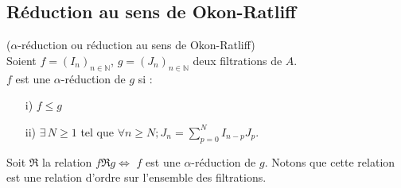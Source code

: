 \subsection{Réduction au sens de Okon-Ratliff}
\begin{madefinition}
	($\alpha$-réduction ou réduction au sens de Okon-Ratliff)\\
	Soient $f=(I_n)_{n \in \mathbb{N}}$, $g=(J_n)_{n \in \mathbb{N}}$ deux filtrations de $A$.\\
	$f$ est une $\alpha$-réduction de $g$ si : \\
	\begin{enumerate}
		\item[i)] $f \leq g$
		\item[ii)] $\exists \, N \geq 1$ tel que $\forall n \geq N ; J_n = \displaystyle \sum_{p=0}^{N}{I_{n-p} J_p}$.
	\end{enumerate}
\end{madefinition}
\begin{maremarque}
	Soit $\Re$ la relation $f \Re g \Leftrightarrow$ $f$ est une $\alpha$-réduction de $g$. Notons que cette relation est une relation d'ordre sur l'ensemble des filtrations.	
\end{maremarque}
